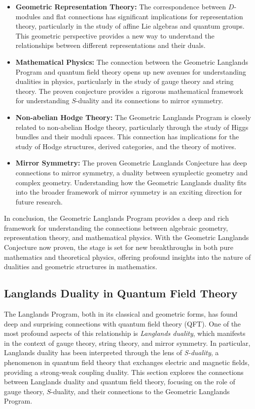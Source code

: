 \documentclass{article}
\theoremstyle{remark}
\begin{document}
\begin{itemize}
    \item \textbf{Geometric Representation Theory:} The correspondence between $D$-modules and flat connections has significant implications for representation theory, particularly in the study of affine Lie algebras and quantum groups. This geometric perspective provides a new way to understand the relationships between different representations and their duals.
    
    \item \textbf{Mathematical Physics:} The connection between the Geometric Langlands Program and quantum field theory opens up new avenues for understanding dualities in physics, particularly in the study of gauge theory and string theory. The proven conjecture provides a rigorous mathematical framework for understanding $S$-duality and its connections to mirror symmetry.
    
    \item \textbf{Non-abelian Hodge Theory:} The Geometric Langlands Program is closely related to non-abelian Hodge theory, particularly through the study of Higgs bundles and their moduli spaces. This connection has implications for the study of Hodge structures, derived categories, and the theory of motives.
    
    \item \textbf{Mirror Symmetry:} The proven Geometric Langlands Conjecture has deep connections to mirror symmetry, a duality between symplectic geometry and complex geometry. Understanding how the Geometric Langlands duality fits into the broader framework of mirror symmetry is an exciting direction for future research.
\end{itemize}

In conclusion, the Geometric Langlands Program provides a deep and rich framework for understanding the connections between algebraic geometry, representation theory, and mathematical physics. With the Geometric Langlands Conjecture now proven, the stage is set for new breakthroughs in both pure mathematics and theoretical physics, offering profound insights into the nature of dualities and geometric structures in mathematics.

\subsection{Langlands Duality in Quantum Field Theory}

The Langlands Program, both in its classical and geometric forms, has found deep and surprising connections with quantum field theory (QFT). One of the most profound aspects of this relationship is \emph{Langlands duality}, which manifests in the context of gauge theory, string theory, and mirror symmetry. In particular, Langlands duality has been interpreted through the lens of \emph{S-duality}, a phenomenon in quantum field theory that exchanges electric and magnetic fields, providing a strong-weak coupling duality. This section explores the connections between Langlands duality and quantum field theory, focusing on the role of gauge theory, $S$-duality, and their connections to the Geometric Langlands Program.
\end{document}
